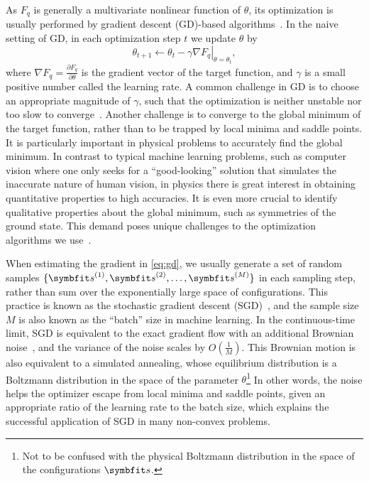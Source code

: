 As $F_q$ is generally a multivariate nonlinear function of $\theta$, its optimization is usually performed by gradient descent (GD)-based algorithms~\cite{curry1944method}. In the naive setting of GD, in each optimization step $t$ we update $\theta$ by
\begin{equation}
\theta_{t + 1} \gets \theta_t - \gamma \left. \nabla F_q \right|_{\theta = \theta_t},
\label{eq:gd}
\end{equation}
where $\nabla F_q = \frac{\partial F_q}{\partial \theta}$ is the gradient vector of the target function, and $\gamma$ is a small positive number called the learning rate. A common challenge in GD is to choose an appropriate magnitude of $\gamma$, such that the optimization is neither unstable nor too slow to converge~\cite{boyd2004convex}. Another challenge is to converge to the global minimum of the target function, rather than to be trapped by local minima and saddle points. It is particularly important in physical problems to accurately find the global minimum. In contrast to typical machine learning problems, such as computer vision where one only seeks for a ``good-looking'' solution that simulates the inaccurate nature of human vision, in physics there is great interest in obtaining quantitative properties to high accuracies. It is even more crucial to identify qualitative properties about the global minimum, such as symmetries of the ground state. This demand poses unique challenges to the optimization algorithms we use~\cite{chen2023efficient, michaud2023precision}.

When estimating the gradient in \cref{eq:gd}, we usually generate a set of random samples $\{\vs^{(1)}, \vs^{(2)}, \ldots, \vs^{(M)}\}$ in each sampling step, rather than sum over the exponentially large space of configurations. This practice is known as the stochastic gradient descent (SGD)~\cite{robbins1951stochastic, bottou1998online}, and the sample size $M$ is also known as the ``batch'' size in machine learning. In the continuous-time limit, SGD is equivalent to the exact gradient flow with an additional Brownian noise~\cite{hu2017diffusion}, and the variance of the noise scales by $O\left( \frac{1}{M} \right)$. This Brownian motion is also equivalent to a simulated annealing, whose equilibrium distribution is a Boltzmann distribution in the space of the parameter $\theta$\footnote{Not to be confused with the physical Boltzmann distribution in the space of the configurations $\vs$.} In other words, the noise helps the optimizer escape from local minima and saddle points, given an appropriate ratio of the learning rate to the batch size, which explains the successful application of SGD in many non-convex problems.

